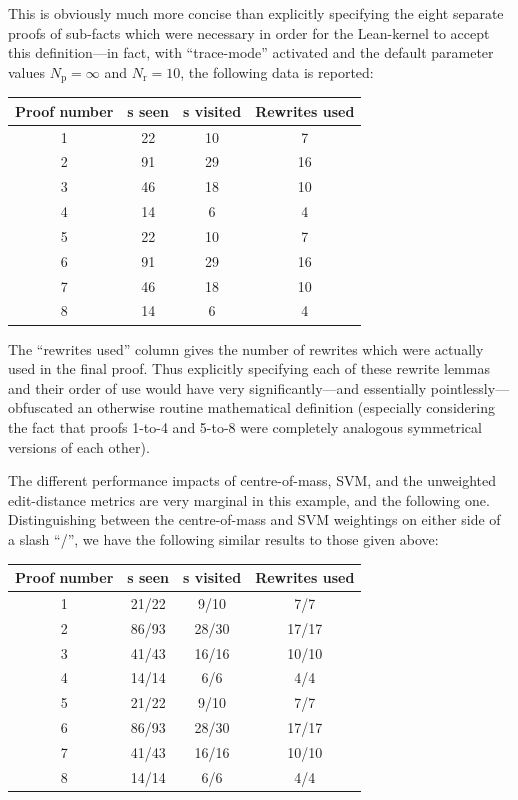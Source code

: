 \documentclass[12pt]{easychair}
\begin{document}
This is obviously much more concise than explicitly specifying the eight separate proofs of sub-facts which were necessary in order for the Lean-kernel to accept this definition---in fact, with ``trace-mode'' activated and the default parameter values $N_\text{p} = \infty$ and $N_\text{r} = 10$, the following data is reported:
\begin{center}
  \begin{tabular}{c c c c}
    \toprule
    Proof number & \expr{}s seen & \expr{}s visited & Rewrites used\\\midrule
1 & 22 & 10 & 7\\
2 & 91 & 29 & 16\\
3 & 46 & 18 & 10\\
4 & 14 & 6 & 4\\
5 & 22 & 10 & 7\\
6 & 91 & 29 & 16\\
7 & 46 & 18 & 10\\
8 & 14 & 6 & 4\\\bottomrule
  \end{tabular}
\end{center}
The ``rewrites used'' column gives the number of rewrites which were actually used in the final proof. Thus explicitly specifying each of these rewrite lemmas and their order of use would have very significantly---and essentially pointlessly---obfuscated an otherwise routine mathematical definition (especially considering the fact that proofs 1-to-4 and 5-to-8 were completely analogous symmetrical versions of each other).

The different performance impacts of centre-of-mass, SVM, and the unweighted edit-distance metrics are very marginal in this example, and the following one.
Distinguishing between the centre-of-mass and SVM weightings on either side of a slash ``/'', we have the following similar results to those given above:
\begin{center}
  \begin{tabular}{c c c c}
    \toprule
    Proof number & \expr{}s seen & \expr{}s visited & Rewrites used\\\midrule
    1 & 21/22 & 9/10 & 7/7\\
    2 & 86/93 & 28/30 & 17/17\\
    3 & 41/43 & 16/16 & 10/10\\
    4 & 14/14 & 6/6 & 4/4\\
    5 & 21/22 & 9/10 & 7/7\\
    6 & 86/93 & 28/30 & 17/17\\
    7 & 41/43 & 16/16 & 10/10\\
    8 & 14/14 & 6/6 & 4/4\\\bottomrule
  \end{tabular}
\end{center}
\end{document}
